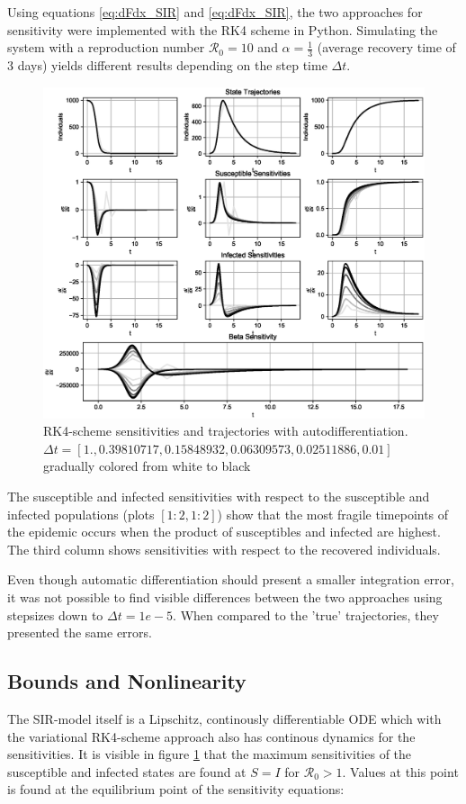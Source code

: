 Using equations \ref{eq:dFdx_SIR} and \ref{eq:dFdx_SIR}, the two approaches for sensitivity were implemented with the RK4 scheme in Python. Simulating the system with a reproduction number $\mathscr{R}_0 = 10$ and $\alpha = \frac{1}{3}$ (average recovery time of 3 days) yields different results depending on the step time $\Delta t$.

\begin{figure}[h]
    \centering
    \includegraphics[width=.9\linewidth]{Figures/Autodiff_Sensitivities.eps}
    \caption{RK4-scheme sensitivities and trajectories with autodifferentiation. $\Delta t = [1.        , 0.39810717, 0.15848932, 0.06309573, 0.02511886,
       0.01      ]$ gradually colored from white to black}
    \label{fig:RK4_Autodiff}
\end{figure}

The susceptible and infected sensitivities with respect to the susceptible and infected populations (plots $[1:2,1:2]$) show that the most fragile timepoints of the epidemic occurs when the product of susceptibles and infected are highest. The third column shows sensitivities with respect to the recovered individuals.

Even though automatic differentiation should present a smaller integration error, it was not possible to find visible differences between the two approaches using stepsizes down to $\Delta t = 1e-5$. When compared to the 'true' trajectories, they presented the same errors.

\subsection{Bounds and Nonlinearity}
The SIR-model itself is a Lipschitz, continously differentiable ODE which with the variational RK4-scheme approach also has continous dynamics for the sensitivities. It is visible in figure \ref{fig:RK4_Autodiff} that the maximum sensitivities of the susceptible and infected states are found at $S = I$ for $\mathscr{R}_0 > 1$. Values at this point is found at the equilibrium point of the sensitivity equations:

